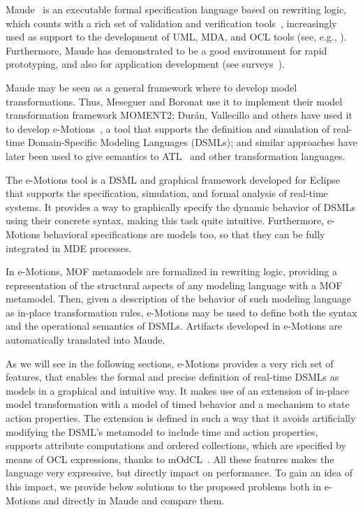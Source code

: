 
Maude~\cite{CDELMMQ:02,CDELMMT:07-book} is an executable formal specification language based on rewriting logic, which counts with a rich set of validation and verification tools~\cite{CDELMMT:07-book,CDHLMO:07}, increasingly used as support to the development of UML, MDA, and OCL tools (see, e.g., \cite{Boronat-Meseguer:08,RRDV:07-jot,Clavel-Egea:2006}). Furthermore, Maude has demonstrated to be a good environment for rapid prototyping, and also for application development (see surveys~\cite{CDELMMT:07-book,Meseguer:2012}). 

Maude may be seen as a general framework where to develop model transformations. Thus, Meseguer and Boronat use it to implement their model transformation framework MOMENT2; Dur\'an, Vallecillo and others have used it to develop e-Motions~\cite{RiveraDV10}, a tool that supports the definition and simulation of real-time Domain-Specific Modeling Languages (DSMLs); and similar approaches have later been used to give semantics to ATL~\cite{TroyaV10} and other transformation languages. 

The e-Motions tool is a DSML and graphical framework developed for Eclipse that supports the specification, simulation, and formal analysis of real-time systems. It provides a way to graphically specify the dynamic behavior of DSMLs using their concrete syntax, making this task quite intuitive. Furthermore, e-Motions behavioral specifications are models too, so that they can be fully integrated in MDE processes.

In e-Motions, MOF metamodels are formalized in rewriting logic, providing a representation of the structural aspects of any modeling language with a MOF metamodel. Then, given a description of the behavior of such modeling language as in-place transformation rules, e-Motions may be used to define both the syntax and the operational semantics of DSMLs. Artifacts developed in e-Motions are automatically translated into Maude.

As we will see in the following sections, e-Motions provides a very rich set of features, that enables the formal and precise definition of real-time DSMLs as models in a graphical and intuitive way. It makes use of an extension of in-place model transformation with a model of timed behavior and a mechanism to state action properties. The extension is defined in such a way that it avoids artificially modifying the DSML's metamodel to include time and action properties, supports attribute computations and ordered collections, which are specified by means of OCL
expressions, thanks to mOdCL~\cite{Roldan-Duran:2008-tr}. All these features makes the language very expressive, but directly impact on performance. To gain an idea of this impact, we provide below solutions to the proposed problems both in e-Motions and directly in Maude and compare them. 

